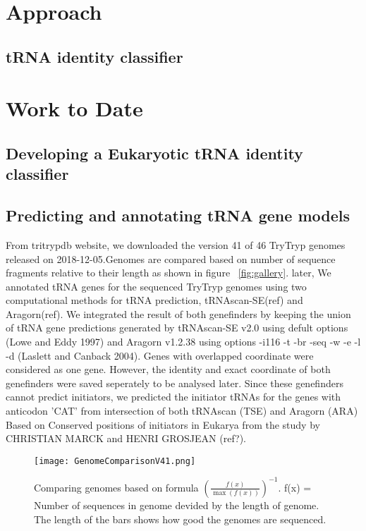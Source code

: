 \documentclass[
10pt, %
a4paper, %
oneside, %
headinclude,footinclude, %
BCOR5mm, %
]{scrartcl}
\begin{document}
\section{Approach}
\subsection{tRNA identity classifier}

\section{Work to Date}
\subsection{Developing a Eukaryotic tRNA identity classifier}
 
\subsection{Predicting and annotating tRNA gene models}
From tritrypdb website, we downloaded the version 41 of 46 TryTryp genomes released on 2018-12-05.Genomes are compared based on number of sequence fragments relative to their length as shown in figure ~\vref{fig:gallery}. later, We annotated tRNA genes for the sequenced TryTryp genomes using two computational methods for tRNA prediction, tRNAscan-SE(ref) and Aragorn(ref). We integrated the result of both genefinders by keeping the union of tRNA gene predictions generated by tRNAscan-SE v2.0 using defult options (Lowe and Eddy 1997) and Aragorn v1.2.38 using options -i116 -t -br -seq -w -e -l -d (Laslett and Canback 2004). Genes with overlapped coordinate were considered as one gene. However, the identity and exact coordinate of both genefinders were saved seperately to be analysed later. Since these genefinders cannot predict initiators, we predicted the initiator tRNAs for the genes with anticodon 'CAT' from intersection of both tRNAscan (TSE) and Aragorn (ARA) Based on Conserved positions of initiators in Eukarya from the study by CHRISTIAN MARCK and HENRI GROSJEAN (ref?).

\begin{figure}[tb]
\centering 
\texttt{[image: GenomeComparisonV41.png]} 
\caption[Genome Comparison]{Comparing genomes based on formula ${(\frac{f(x)}{\max(f(x))})}^{-1}$. f(x) = Number of sequences in genome devided by the length of genome. The length of the bars shows how good the genomes are sequenced.} %
\label{fig:gallery} 
\end{figure}
\end{document}
